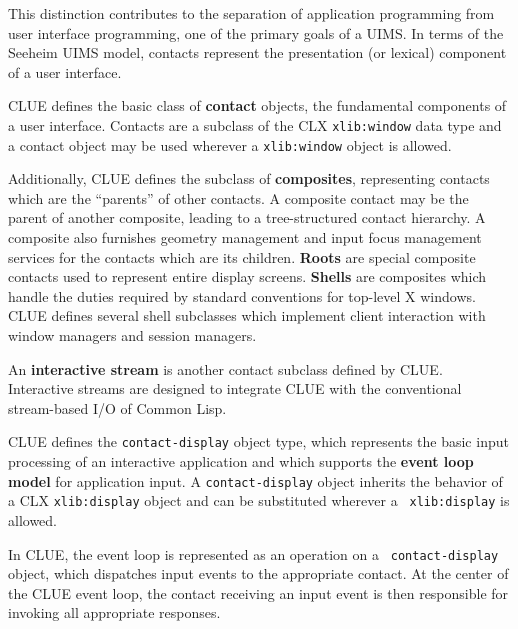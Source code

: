 This distinction contributes to the separation of application
programming
from user interface programming, one of the primary goals of a
UIMS.
In terms of the Seeheim UIMS model\cite{pfaff-uims}, contacts represent
the presentation (or lexical) component of a user interface.

CLUE defines the basic class of  {\bf contact} objects, the fundamental
components of a user interface. 
Contacts are a subclass of the CLX {\tt xlib:window} data type and a 
contact object may be used wherever a {\tt xlib:window} object is allowed. 

Additionally, CLUE defines the 
subclass of {\bf composites}, representing contacts which are the
``parents'' of other
contacts. A composite contact may be the parent of another composite,
leading to a tree-structured contact hierarchy. 
A composite also furnishes geometry management and input focus management
services for the contacts which are its children.
{\bf Roots} are special composite contacts used
to represent entire display screens. {\bf Shells} are composites
which handle the duties required by standard conventions for top-level
X windows\cite{icccm}. CLUE defines several
shell subclasses which implement
client interaction with window managers and session managers.

An {\bf interactive 
stream} is another contact subclass defined by CLUE. Interactive streams
are designed to integrate CLUE with the conventional stream-based I/O of
Common Lisp.

CLUE defines the {\tt contact-display} object type, which represents the
basic input processing of an interactive application and which supports
the {\bf event loop model} for application
input. 
A {\tt contact-display} object inherits the behavior of a CLX
{\tt xlib:display} object and can be substituted wherever a {\tt
xlib:display} is allowed.

In CLUE, the event loop is represented as an operation on a {\tt
contact-display} object, which dispatches input events to the
appropriate contact. At the center of the CLUE event loop,
the contact receiving an input event is then responsible for invoking all
appropriate responses.

